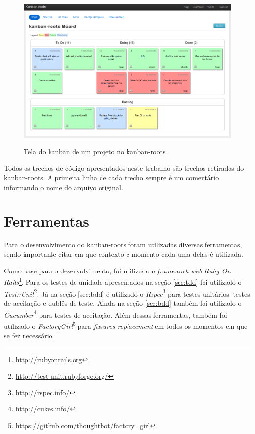 \begin{figure}[h]
  \center
  \caption{Tela do kanban de um projeto no kanban-roots}
  \includegraphics[scale=0.45]{images/kanban-roots}
  \label{img:tela_kaban_roots}
\end{figure}

Todos os trechos de código apresentados neste trabalho são trechos retirados do kanban-roots. A primeira linha de cada trecho sempre é um comentário informando o nome do arquivo original.

\section{Ferramentas}

Para o desenvolvimento do kanban-roots foram utilizadas diversas ferramentas, sendo importante citar em que contexto e momento cada uma delas é utilizada.

Como base para o desenvolvimento, foi utilizado o \textit{framework web} \textit{Ruby On Rails}\footnote{\url{http://rubyonrails.org}}. Para os testes de unidade apresentados na seção \ref{sec:tdd} foi utilizado o \textit{Test::Unit}\footnote{\url{http://test-unit.rubyforge.org/}}. Já na seção \ref{sec:bdd} é utilizado o \textit{Rspec}\footnote{\url{http://rspec.info/}} para testes unitários, testes de aceitação e dublês de teste. Ainda na seção \ref{sec:bdd} também foi utilizado o \textit{Cucumber}\footnote{\url{http://cukes.info/}} para testes de aceitação. Além dessas ferramentas, também foi utilizado o \textit{FactoryGirl}\footnote{\url{https://github.com/thoughtbot/factory_girl}} para \textit{fixtures replacement} em todos os momentos em que se fez necessário.